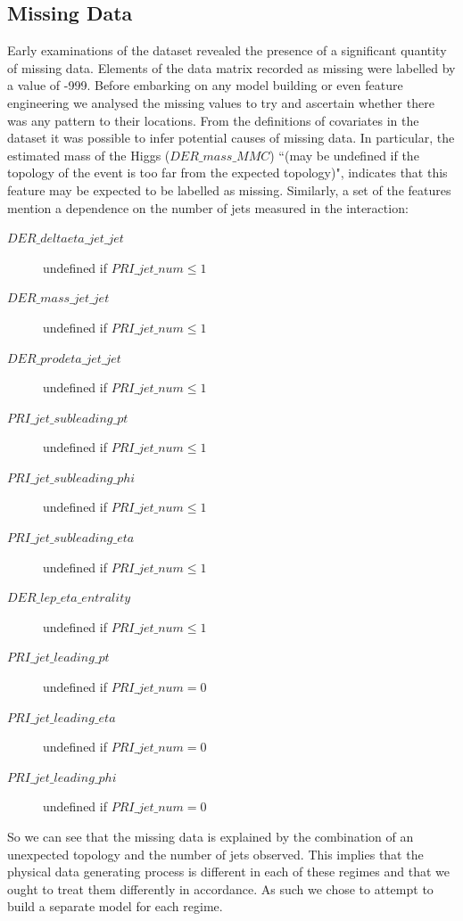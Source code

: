 \subsection{Missing Data}
Early examinations of the dataset revealed the presence of a significant quantity of missing data. Elements of the data matrix recorded as missing were labelled by a value of -999. Before embarking on any model building or even feature engineering we analysed the missing values to try and ascertain whether there was any pattern to their locations. From the definitions of covariates in the dataset it was possible to infer potential causes of missing data. In particular, the estimated mass of the Higgs ($DER\_mass\_MMC$) ``(may be undefined if the topology of the event is too far from the expected topology)", indicates that this feature may be expected to be labelled as missing. Similarly, a set of the features mention a dependence on the number of jets measured in the interaction:

\begin{description}
    \item[$DER\_deltaeta\_jet\_jet$] undefined if $PRI\_jet\_num \leq 1$
    \item[$DER\_mass\_jet\_jet$] undefined if $PRI\_jet\_num \leq 1$
    \item[$DER\_prodeta\_jet\_jet$] undefined if $PRI\_jet\_num \leq 1$
    \item[$PRI\_jet\_subleading\_pt$] undefined if $PRI\_jet\_num \leq 1$
    \item[$PRI\_jet\_subleading\_phi$] undefined if $PRI\_jet\_num \leq 1$
    \item[$PRI\_jet\_subleading\_eta$] undefined if $PRI\_jet\_num \leq 1$
    \item[$DER\_lep\_eta\_entrality$] undefined if $PRI\_jet\_num \leq 1$
    \item[$PRI\_jet\_leading\_pt$] undefined if $PRI\_jet\_num = 0$
    \item[$PRI\_jet\_leading\_eta$] undefined if $PRI\_jet\_num = 0$
    \item[$PRI\_jet\_leading\_phi$] undefined if $PRI\_jet\_num = 0$   
\end{description}

So we can see that the missing data is explained by the combination of an unexpected topology and the number of jets observed. This implies that the physical data generating process is different in each of these regimes and that we ought to treat them differently in accordance. As such we chose to attempt to build a separate model for each regime. 

